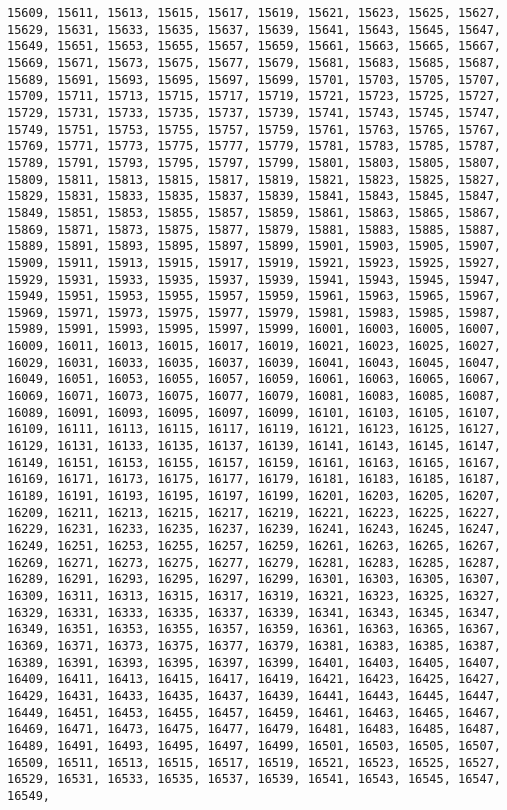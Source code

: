\documentclass[11pt]{article}
\begin{document}
\begin{Verbatim}[commandchars=\\\{\}]
15609, 15611, 15613, 15615, 15617, 15619, 15621, 15623, 15625, 15627, 15629, 15631, 15633, 15635, 15637, 15639, 15641, 15643, 15645, 15647, 15649, 15651, 15653, 15655, 15657, 15659, 15661, 15663, 15665, 15667, 15669, 15671, 15673, 15675, 15677, 15679, 15681, 15683, 15685, 15687, 15689, 15691, 15693, 15695, 15697, 15699, 15701, 15703, 15705, 15707, 15709, 15711, 15713, 15715, 15717, 15719, 15721, 15723, 15725, 15727, 15729, 15731, 15733, 15735, 15737, 15739, 15741, 15743, 15745, 15747, 15749, 15751, 15753, 15755, 15757, 15759, 15761, 15763, 15765, 15767, 15769, 15771, 15773, 15775, 15777, 15779, 15781, 15783, 15785, 15787, 15789, 15791, 15793, 15795, 15797, 15799, 15801, 15803, 15805, 15807, 15809, 15811, 15813, 15815, 15817, 15819, 15821, 15823, 15825, 15827, 15829, 15831, 15833, 15835, 15837, 15839, 15841, 15843, 15845, 15847, 15849, 15851, 15853, 15855, 15857, 15859, 15861, 15863, 15865, 15867, 15869, 15871, 15873, 15875, 15877, 15879, 15881, 15883, 15885, 15887, 15889, 15891, 15893, 15895, 15897, 15899, 15901, 15903, 15905, 15907, 15909, 15911, 15913, 15915, 15917, 15919, 15921, 15923, 15925, 15927, 15929, 15931, 15933, 15935, 15937, 15939, 15941, 15943, 15945, 15947, 15949, 15951, 15953, 15955, 15957, 15959, 15961, 15963, 15965, 15967, 15969, 15971, 15973, 15975, 15977, 15979, 15981, 15983, 15985, 15987, 15989, 15991, 15993, 15995, 15997, 15999, 16001, 16003, 16005, 16007, 16009, 16011, 16013, 16015, 16017, 16019, 16021, 16023, 16025, 16027, 16029, 16031, 16033, 16035, 16037, 16039, 16041, 16043, 16045, 16047, 16049, 16051, 16053, 16055, 16057, 16059, 16061, 16063, 16065, 16067, 16069, 16071, 16073, 16075, 16077, 16079, 16081, 16083, 16085, 16087, 16089, 16091, 16093, 16095, 16097, 16099, 16101, 16103, 16105, 16107, 16109, 16111, 16113, 16115, 16117, 16119, 16121, 16123, 16125, 16127, 16129, 16131, 16133, 16135, 16137, 16139, 16141, 16143, 16145, 16147, 16149, 16151, 16153, 16155, 16157, 16159, 16161, 16163, 16165, 16167, 16169, 16171, 16173, 16175, 16177, 16179, 16181, 16183, 16185, 16187, 16189, 16191, 16193, 16195, 16197, 16199, 16201, 16203, 16205, 16207, 16209, 16211, 16213, 16215, 16217, 16219, 16221, 16223, 16225, 16227, 16229, 16231, 16233, 16235, 16237, 16239, 16241, 16243, 16245, 16247, 16249, 16251, 16253, 16255, 16257, 16259, 16261, 16263, 16265, 16267, 16269, 16271, 16273, 16275, 16277, 16279, 16281, 16283, 16285, 16287, 16289, 16291, 16293, 16295, 16297, 16299, 16301, 16303, 16305, 16307, 16309, 16311, 16313, 16315, 16317, 16319, 16321, 16323, 16325, 16327, 16329, 16331, 16333, 16335, 16337, 16339, 16341, 16343, 16345, 16347, 16349, 16351, 16353, 16355, 16357, 16359, 16361, 16363, 16365, 16367, 16369, 16371, 16373, 16375, 16377, 16379, 16381, 16383, 16385, 16387, 16389, 16391, 16393, 16395, 16397, 16399, 16401, 16403, 16405, 16407, 16409, 16411, 16413, 16415, 16417, 16419, 16421, 16423, 16425, 16427, 16429, 16431, 16433, 16435, 16437, 16439, 16441, 16443, 16445, 16447, 16449, 16451, 16453, 16455, 16457, 16459, 16461, 16463, 16465, 16467, 16469, 16471, 16473, 16475, 16477, 16479, 16481, 16483, 16485, 16487, 16489, 16491, 16493, 16495, 16497, 16499, 16501, 16503, 16505, 16507, 16509, 16511, 16513, 16515, 16517, 16519, 16521, 16523, 16525, 16527, 16529, 16531, 16533, 16535, 16537, 16539, 16541, 16543, 16545, 16547, 16549, 
\end{Verbatim}
\end{document}
